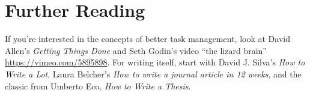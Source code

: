 \documentclass{tufte-handout}
\begin{document}
\def\ind{\hangindent=1 true cm\hangafter=1 \noindent}
\def\labelitemi{~}
\renewcommand{\labelitemii}{~}
\section{Further Reading}

If you're interested in the concepts of better task management, look at David Allen's \textit{Getting Things Done} and Seth Godin's video ``the lizard brain'' \url{https://vimeo.com/5895898}. For writing itself, start with David J. Silva's \textit{How to Write a Lot}, Laura Belcher's \textit{How to write a journal article in 12 weeks}, and the classic from Umberto Eco, \textit{How to Write a Thesis}. 



% 
% 
\end{document}
